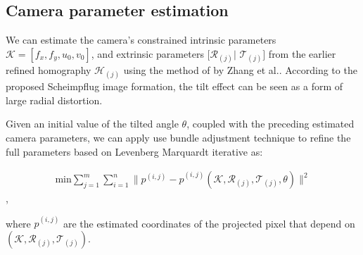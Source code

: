 \documentclass[12pt]{article}
\begin{document}
%
%



\subsection{Camera parameter estimation}

We can estimate the camera's constrained intrinsic parameters $\mathcal{K}=[f_x, f_y, u_0, v_0]$, and extrinsic parameters $[\mathcal{R}_{(j)}|$ $\mathcal{T}_{(j)}]$ from the earlier refined homography $\mathcal{H}_{(j)}$ using the method of by Zhang et al.\cite{Zhang:2000:FN}.  According to the proposed Scheimpflug image formation, the tilt effect can be seen as a form of large radial distortion.

Given an initial value of the tilted angle $\theta$, coupled with the preceding estimated camera parameters, we can apply use bundle adjustment technique to refine the full parameters based on Levenberg Marquardt iterative as: 

\begin{equation}  
\begin{split}
\text{min} \sum\limits_{j=1}^m\sum\limits_{i=1}^n\|{p}^{(i,j)} - \hat{p}^{(i,j)}(\mathcal{K},\mathcal{R}_{(j)},\mathcal{T}_{(j)}, \theta)\|^2
\end{split}
 \label{eqn:Rbsplit}
\end{equation},

where $\hat{p}^{(i,j)}$ are the estimated coordinates of the projected pixel that depend on $(\mathcal{K},\mathcal{R}_{(j)},\mathcal{T}_{(j)})$.
\end{document}
